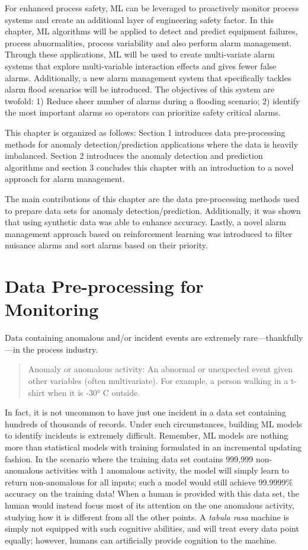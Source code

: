 For enhanced process safety, ML can be leveraged to proactively monitor process systems and create an additional layer of engineering safety factor. In this chapter, ML algorithms will be applied to detect and predict equipment failures, process abnormalities, process variability and also perform alarm management. Through these applications, ML will be used to create multi-variate alarm systems that explore multi-variable interaction effects and gives fewer false alarms. Additionally, a new alarm management system that specifically tackles alarm flood scenarios will be introduced.  The objectives of this system are twofold: 1) Reduce sheer number of alarms during a flooding scenario; 2) identify the most important alarms so operators can prioritize safety critical alarms.

This chapter is organized as follows: Section 1 introduces data pre-processing methods for anomaly detection/prediction applications where the data is heavily imbalanced.  Section 2 introduces the anomaly detection and prediction algorithms and section 3 concludes this chapter with an introduction to a novel approach for alarm management.

The main contributions of this chapter are the data pre-processing methods used to prepare data sets for anomaly detection/prediction.  Additionally, it was shown that using synthetic data was able to enhance accuracy.  Lastly, a novel alarm management approach based on reinforcement learning was introduced to filter nuisance alarms and sort alarms based on their priority.  


\section{Data Pre-processing for Monitoring}
Data containing anomalous and/or incident events are extremely rare---thankfully---in the process industry. \begin{quote}
    Anomaly or anomalous activity: An abnormal or unexpected event given other variables (often multivariate).  For example, a person walking in a t-shirt when it is -$\ang{30}$ C outside.
\end{quote}

In fact, it is not uncommon to have just one incident in a data set containing hundreds of thousands of records.  Under such circumstances, building ML models to identify incidents is extremely difficult.  Remember, ML models are nothing more than statistical models with training formulated in an incremental updating fashion. In the scenario where the training data set contains 999,999 non-anomalous activities with 1 anomalous activity, the model will simply learn to return non-anomalous for all inputs; such a model would still achieve 99.9999\% accuracy on the training data!  When a human is provided with this data set, the human would instead focus most of its attention on the one anomalous activity, studying how it is different from all the other points.  A \textit{tabula rasa} machine is simply not equipped with such cognitive abilities, and will treat every data point equally; however, humans can artificially provide cognition to the machine.

